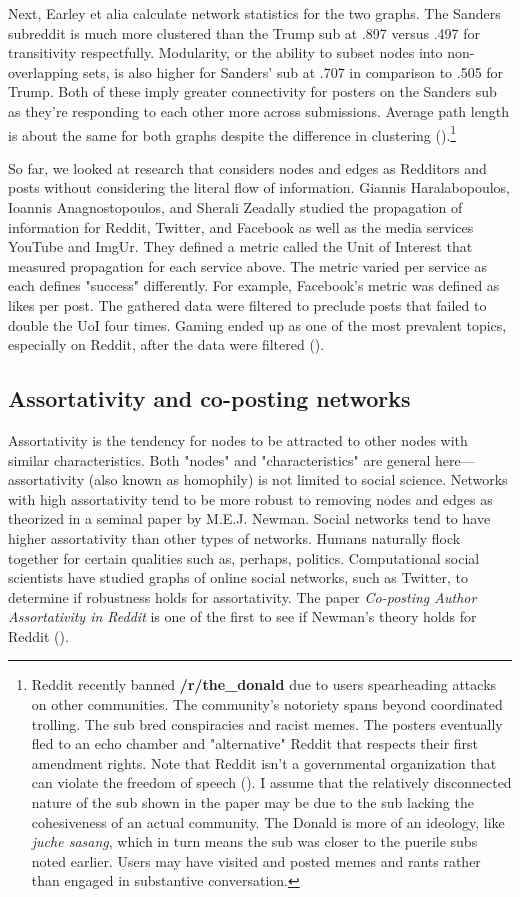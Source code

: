 \documentclass[12pt, a4paper]{article}
\begin{document}
Next, Earley et alia calculate network statistics for the two graphs. The Sanders subreddit is much more clustered than the Trump sub at .897 versus .497 for transitivity respectfully. Modularity, or the ability to subset nodes into non-overlapping sets, is also higher for Sanders' sub at .707 in comparison to .505 for Trump. Both of these imply greater connectivity for posters on the Sanders sub as they're responding to each other more across submissions. Average path length is about the same for both graphs despite the difference in clustering (\cite{causeweb2017}).\footnote{Reddit recently banned \textbf{/r/the\_donald} due to users spearheading attacks on other communities. The community's notoriety spans beyond coordinated trolling. The sub bred conspiracies and racist memes. The posters eventually fled to an echo chamber and "alternative" Reddit that respects their first amendment rights. Note that Reddit isn't a governmental organization that can violate the freedom of speech (\cite{thedonaldban2020}). I assume that the relatively disconnected nature of the sub shown in the paper may be due to the sub lacking the cohesiveness of an actual community. The Donald is more of an ideology, like \textit{juche sasang}, which in turn means the sub was closer to the puerile subs noted earlier. Users may have visited and posted memes and rants rather than engaged in substantive conversation.}

So far, we looked at research that considers nodes and edges as Redditors and posts without considering the literal flow of information. Giannis Haralabopoulos, Ioannis Anagnostopoulos, and Sherali Zeadally studied the propagation of information for Reddit, Twitter, and Facebook as well as the media services YouTube and ImgUr. They defined a metric called the Unit of Interest that measured propagation for each service above. The metric varied per service as each defines "success" differently. For example, Facebook's metric was defined as likes per post. The gathered data were filtered to preclude posts that failed to double the UoI four times. Gaming ended up as one of the most prevalent topics, especially on Reddit, after the data were filtered (\cite{haralabopoulos2015}).

\subsection{Assortativity and co-posting networks}
Assortativity is the tendency for nodes to be attracted to other nodes with similar characteristics. Both "nodes" and "characteristics" are general here---assortativity (also known as homophily) is not limited to social science. Networks with high assortativity tend to be more robust to removing nodes and edges as theorized in a seminal paper by M.E.J. Newman. Social networks tend to have higher assortativity than other types of networks. Humans naturally flock together for certain qualities such as, perhaps, politics. Computational social scientists have studied graphs of online social networks, such as Twitter, to determine if robustness holds for assortativity. The paper \textit{Co-posting Author Assortativity in Reddit} is one of the first to see if Newman's theory holds for Reddit (\cite{cauteruccio2020}).
\end{document}
